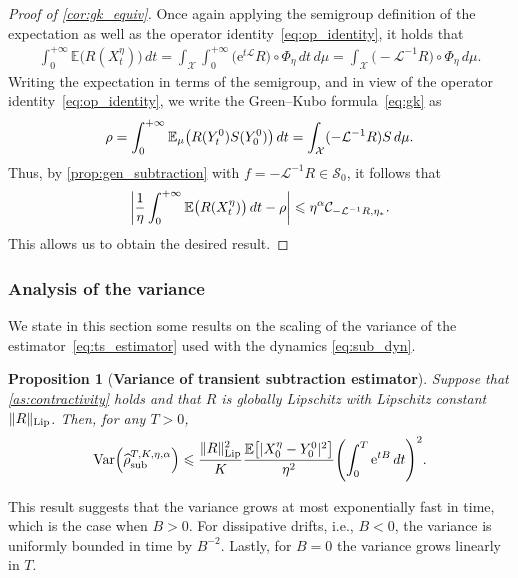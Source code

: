 \documentclass[11pt]{article}
\newcommand{\E}{\mathbb{E}}
\newcommand{\e}{\mathrm{e}}
\renewcommand{\L}{\mathcal{L}}
\renewcommand{\S}{\mathscr{S}}
\renewcommand{\leq}{\leqslant}
\DeclareMathOperator{\Var}{Var}
\DeclarePairedDelimiter\abs{\lvert}{\rvert}
\DeclarePairedDelimiter\paren{\lparen}{\rparen}
\DeclarePairedDelimiter\bkt{\lbrack}{\rbrack}
\newtheorem{proposition}[theorem]{Proposition}
\theoremstyle{definition}
\newcommand{\RLip}{\|R\|_{\rm Lip}}
\newcommand{\estTmp}{\widehat{\rho}}
\newcommand{\aTSest}{\estTmp^{T,K,\eta,\alpha}_{\rm sub}} %
\begin{document}
\begin{proof}[Proof of \cref{cor:gk_equiv}]
Once again applying the semigroup definition of the expectation as well as the operator identity~\eqref{eq:op_identity}, it holds that
\begin{align}
		\int_0^{+\infty} \E\bigl(R(X^\eta_t)\bigr) \, dt = \int_\mathcal{X}\int_0^{+\infty} \bigl(\e^{t\L}R\bigr)\circ \Phi_\eta \, dt \, d\mu
= \int_\mathcal{X} \bigl(-\L^{-1}R\bigr)\circ \Phi_\eta \, d\mu.
		\label{eq:cor_Tint_to_LinvR}
	\end{align}
Writing the expectation in terms of the semigroup, and in view of the operator identity~\eqref{eq:op_identity}, we write the Green--Kubo formula~\eqref{eq:gk} as
\begin{align}
    \notag
		\rho = \int_0^{+\infty} \E_\mu\bigl(R(Y_t^0)S(Y_0^0)\bigr) \, dt = \int_\mathcal{X} (-\L^{-1}R)S \, d\mu.
	\end{align}
Thus, by \cref{prop:gen_subtraction} with $f = -\L^{-1}R \in \S_0$, it follows that
\begin{equation}
		\abs*{\frac{1}{\eta}\int_0^{+\infty} \E\bigl(R(X^\eta_t)\bigr) \, dt - \rho} \leq \eta^{\alpha} \mathcal{C}_{-\L^{-1}R,\eta_*}.
		\label{eq:cor_eta_bias}
	\end{equation}
This allows us to obtain the desired result.
\end{proof}

\subsubsection{Analysis of the variance}
\label{subsubsec:variance_analysis}
We state in this section some results on the scaling of the variance of the estimator~\eqref{eq:ts_estimator} used with the dynamics \eqref{eq:sub_dyn}.

\begin{proposition}[{\bf Variance of transient subtraction estimator}]
	\label{prop:var_ts}
	Suppose that \cref{as:contractivity} holds and that $R$ is globally Lipschitz with Lipschitz constant $\RLip$. Then, for any $T>0$,
\begin{equation}
		\Var\paren*{\aTSest} \leq \frac{\RLip^2}{K}\frac{\E\bkt*{|X_0^\eta - Y_0^0|^2}}{\eta^2}\paren*{\int_0^T \e^{tB} \, dt}^2.
\label{eq:var_prop_bound}
	\end{equation}
\end{proposition}
This result suggests that the variance grows at most exponentially fast in time, which is the case when $B>0$. For dissipative drifts, i.e., $B<0$, the variance is uniformly bounded in time by $B^{-2}$. Lastly, for $B=0$ the variance grows linearly in $T$.
\end{document}
